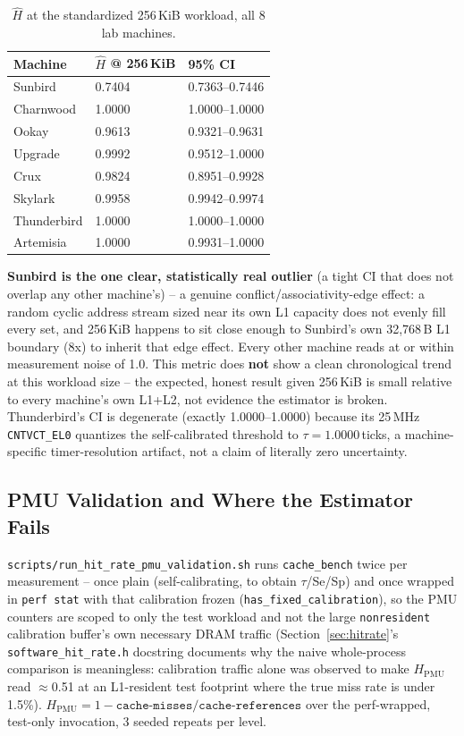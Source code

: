 \documentclass{article}
\begin{document}
\begin{table}[H]
\centering\small
\caption{$\widehat{H}$ at the standardized 256\,KiB workload, all 8 lab machines.}
\begin{tabular}{|l|l|l|}
\hline
Machine & $\widehat{H}$ @ 256\,KiB & 95\% CI\\
\hline
Sunbird & 0.7404 & 0.7363--0.7446\\
Charnwood & 1.0000 & 1.0000--1.0000\\
Ookay & 0.9613 & 0.9321--0.9631\\
Upgrade & 0.9992 & 0.9512--1.0000\\
Crux & 0.9824 & 0.8951--0.9928\\
Skylark & 0.9958 & 0.9942--0.9974\\
Thunderbird & 1.0000 & 1.0000--1.0000\\
Artemisia & 1.0000 & 0.9931--1.0000\\
\hline
\end{tabular}
\end{table}

\textbf{Sunbird is the one clear, statistically real outlier} (a tight CI that does not
overlap any other machine's) -- a genuine conflict/associativity-edge effect: a random
cyclic address stream sized near its own L1 capacity does not evenly fill every set, and
256\,KiB happens to sit close enough to Sunbird's own 32,768\,B L1 boundary (8x) to inherit
that edge effect. Every other machine reads at or within measurement noise of 1.0. This
metric does \textbf{not} show a clean chronological trend at this workload size -- the
expected, honest result given 256\,KiB is small relative to every machine's own L1+L2, not
evidence the estimator is broken. Thunderbird's CI is degenerate (exactly
1.0000--1.0000) because its 25\,MHz \texttt{CNTVCT\_EL0} quantizes the self-calibrated
threshold to $\tau=1.0000$\,ticks, a machine-specific timer-resolution artifact, not a
claim of literally zero uncertainty.

\subsection{PMU Validation and Where the Estimator Fails}
\label{sec:hitrate-pmu}

\texttt{scripts/run\_hit\_rate\_pmu\_validation.sh} runs \texttt{cache\_bench} twice per
measurement -- once plain (self-calibrating, to obtain $\tau$/Se/Sp) and once wrapped in
\texttt{perf stat} with that calibration frozen (\texttt{has\_fixed\_calibration}), so the
PMU counters are scoped to only the test workload and not the large \texttt{nonresident}
calibration buffer's own necessary DRAM traffic (Section~\ref{sec:hitrate}'s
\texttt{software\_hit\_rate.h} docstring documents why the naive whole-process comparison is
meaningless: calibration traffic alone was observed to make $H_{\text{PMU}}$ read
$\approx$0.51 at an L1-resident test footprint where the true miss rate is under 1.5\%).
$H_{\text{PMU}} = 1 - \texttt{cache-misses}/\texttt{cache-references}$ over the
perf-wrapped, test-only invocation, 3 seeded repeats per level.
\end{document}
